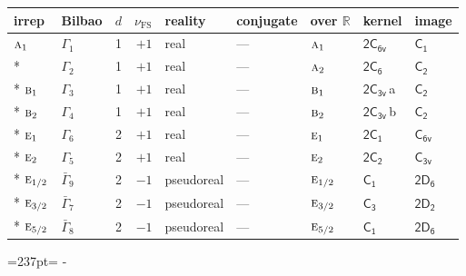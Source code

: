 \documentclass[10pt,a4paper]{article}
\makeatletter
\def\grouprule#1#2{\noalign{\marks\LTgroupmarks{\the\belowrulesep}\nobreak\vskip#1%
  \vskip\aboverulesep}\multispan\LT@cols\unskip{\leaders\hrule\@height#2\hfill\kern\z@}\cr
  \noalign{\penalty\LTrulebreak\vskip\belowrulesep\global\@lastruleclass\z@}}
\newcommand{\needspace}[1]{\par\penalty-100\begingroup\dimen0=#1\relax\dimen2=\pagegoal
  \advance\dimen2-\pagetotal\ifdim\dimen0>\dimen2\relax\ifdim\dimen2>0pt\vfil\break\fi\fi
  \endgroup}
\numberwithin{equation}{section}
\newcommand{\grp}[1]{\mathsf{#1}}
\newcommand{\irr}[1]{\text{\normalfont\scshape #1}}
\newcommand{\detbox}[1]{{\setlength{\fboxsep}{1pt}\fbox{#1}}}
\newcommand{\clsletter}[1]{\,{\scriptsize\color{black!55}#1}}
\newcommand{\fsind}{\nu_{\mathrm{FS}}}
\makeatother
\begin{document}
\setlength{\emergencystretch}{2em}\par\setlength{\emergencystretch}{0pt}
{\small\renewcommand{\arraystretch}{1.25}\setlength{\tabcolsep}{4pt}\begin{longtable}{@{}llrrlllll@{}}\toprule
irrep & Bilbao & $d$ & $\fsind$ & reality & conjugate & over $\mathbb{R}$ & kernel & image\\\midrule\endhead
\bottomrule\endfoot\endlastfoot
$\irr{a}_{1}$ & $\Gamma_{1}$ & 1 & $+1$ & real & --- & $\irr{a}_{1}$ & \href{2C6v.pdf}{$\grp{2C_{6v}}$} & \href{../../../rotation/data/pdf/C1.pdf}{$\grp{C_{1}}$}\\*
\detbox{$\irr{a}_{2}$} & $\Gamma_{2}$ & 1 & $+1$ & real & --- & $\irr{a}_{2}$ & \href{2C6.pdf}{$\grp{2C_{6}}$} & \href{../../../rotation/data/pdf/C2.pdf}{$\grp{C_{2}}$}\\*
$\irr{b}_{1}$ & $\Gamma_{3}$ & 1 & $+1$ & real & --- & $\irr{b}_{1}$ & \href{2C3v.pdf}{$\grp{2C_{3v}}$}\clsletter{a} & \href{../../../rotation/data/pdf/C2.pdf}{$\grp{C_{2}}$}\\*
$\irr{b}_{2}$ & $\Gamma_{4}$ & 1 & $+1$ & real & --- & $\irr{b}_{2}$ & \href{2C3v.pdf}{$\grp{2C_{3v}}$}\clsletter{b} & \href{../../../rotation/data/pdf/C2.pdf}{$\grp{C_{2}}$}\\*
$\irr{e}_{1}$ & $\Gamma_{6}$ & 2 & $+1$ & real & --- & $\irr{e}_{1}$ & \href{2C1.pdf}{$\grp{2C_{1}}$} & \href{../../../rotation/data/pdf/C6v.pdf}{$\grp{C_{6v}}$}\\*
$\irr{e}_{2}$ & $\Gamma_{5}$ & 2 & $+1$ & real & --- & $\irr{e}_{2}$ & \href{2C2.pdf}{$\grp{2C_{2}}$} & \href{../../../rotation/data/pdf/C3v.pdf}{$\grp{C_{3v}}$}\\*
\grouprule{0pt}{\lightrulewidth}
$\irr{e}_{1/2}$ & $\bar{\Gamma}_{9}$ & 2 & $-1$ & pseudoreal & --- & $\irr{e}_{1/2}$ & \href{C1.pdf}{$\grp{C_{1}}$} & \href{2D6.pdf}{$\grp{2D_{6}}$}\\*
$\irr{e}_{3/2}$ & $\bar{\Gamma}_{7}$ & 2 & $-1$ & pseudoreal & --- & $\irr{e}_{3/2}$ & \href{C3.pdf}{$\grp{C_{3}}$} & \href{2D2.pdf}{$\grp{2D_{2}}$}\\*
$\irr{e}_{5/2}$ & $\bar{\Gamma}_{8}$ & 2 & $-1$ & pseudoreal & --- & $\irr{e}_{5/2}$ & \href{C1.pdf}{$\grp{C_{1}}$} & \href{2D6.pdf}{$\grp{2D_{6}}$}\\
\bottomrule\end{longtable}}
\needspace{237pt}
\end{document}
